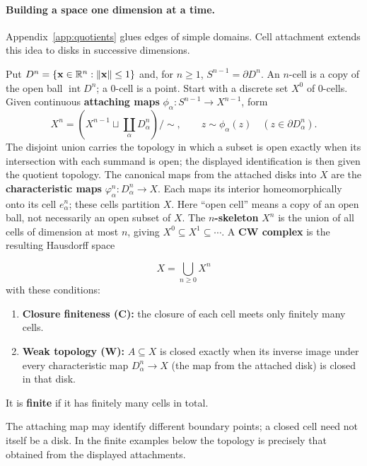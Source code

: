 \paragraph{Building a space one dimension at a time.}
Appendix~\ref{app:quotients} glues edges of simple domains. Cell attachment
extends this idea to disks in successive dimensions.
\begin{definition}
Put $D^n=\{\mathbf{x}\in\mathbb{R}^n:\|\mathbf{x}\|\leq1\}$ and, for $n\geq1$,
$S^{n-1}=\partial D^n$. An $n$-cell is a copy of the open ball
$\operatorname{int}D^n$; a $0$-cell is a point.
Start with a discrete set $X^0$ of $0$-cells. Given continuous
\textbf{attaching maps} $\phi_\alpha:S^{n-1}\to X^{n-1}$, form
\[
X^n=\left(X^{n-1}\sqcup\coprod_\alpha D^n_\alpha\right)/{\sim},
\qquad z\sim\phi_\alpha(z)\quad(z\in\partial D^n_\alpha).
\]
The disjoint union carries the topology in which a subset is open exactly
when its intersection with each summand is open; the displayed
identification is then given the quotient topology.
The canonical maps from the attached disks into $X$ are the
\textbf{characteristic maps} $\varphi^n_\alpha:D^n_\alpha\to X$.
Each maps its interior homeomorphically onto its cell $e^n_\alpha$;
these cells partition $X$. Here ``open cell'' means a copy of an open
ball, not necessarily an open subset of $X$.
The \textbf{$n$-skeleton} $X^n$ is the union of all cells of dimension
at most $n$, giving $X^0\subseteq X^1\subseteq\cdots$.
A \textbf{CW complex} is the resulting Hausdorff space

\[
X=\bigcup_{n\geq0}X^n
\]
 with these conditions:
\begin{enumerate}
\item \textbf{Closure finiteness (C):} the closure of each cell meets only
finitely many cells.
\item \textbf{Weak topology (W):} $A\subseteq X$ is closed exactly when
its inverse image under every characteristic map $D^n_\alpha\to X$
(the map from the attached disk) is closed in that disk.
\end{enumerate}
It is \textbf{finite} if it has finitely many cells in total.
\end{definition}
The attaching map may identify different boundary points; a closed cell
need not itself be a disk. In the finite examples below the topology is
precisely that obtained from the displayed attachments.

